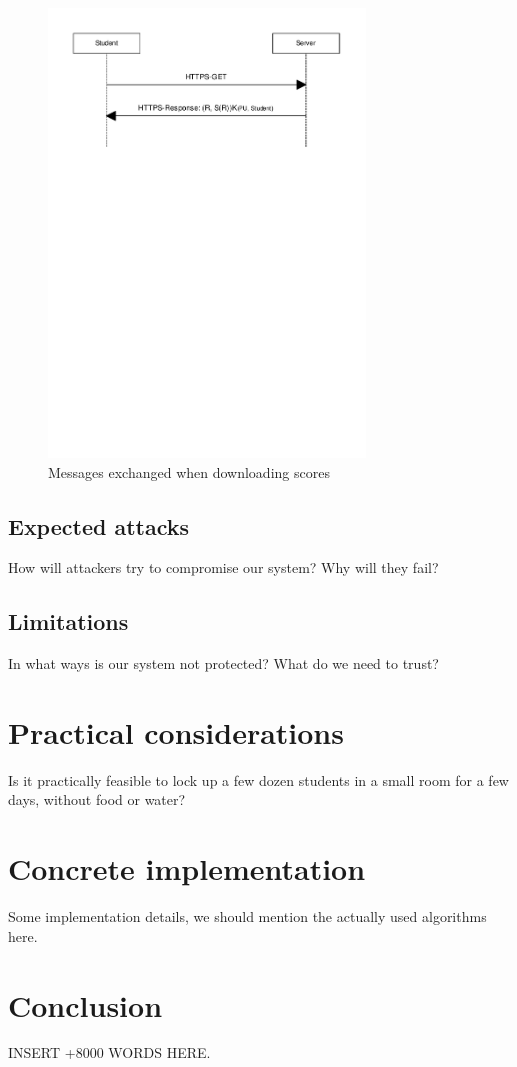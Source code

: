 \documentclass{article}
\begin{document}
\begin{figure}
\begin{center}
\includegraphics[width=0.75\textwidth]{images/download_scores.pdf}
\caption{Messages exchanged when downloading scores}
\label{fig:download-scores}
\end{center}
\end{figure}


\subsection{Expected attacks}

How will attackers try to compromise our system? Why will they fail?

\subsection{Limitations}

In what ways is our system not protected? What do we need to trust?

\section{Practical considerations}

Is it practically feasible to lock up a few dozen students in a small room for a
few days, without food or water?

\section{Concrete implementation}

Some implementation details, we should mention the actually used algorithms
here.

\section{Conclusion}

INSERT +8000 WORDS HERE.
\end{document}
